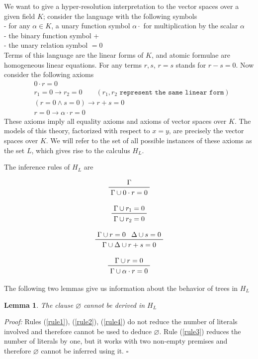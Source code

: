 \documentclass[a4paper,12pt,oneside]{book}
\newtheorem{lemma}[theorem]{Lemma}
\newcommand*{\QED}{\hfill\ensuremath{\square}}
\let\emptyset\varnothing
\let\e\wedge
\begin{document}
We want to give a hyper-resolution interpretation to the vector spaces over a given field $K$; consider the language with the following symbols\\
- for any $\alpha\in K$, a unary function symbol $\alpha\cdot$ for multiplication by the scalar $\alpha$\\
-  the binary function symbol +\\
- the unary relation symbol $=0$\\
Terms of this language are the linear forms of $K$, and atomic formulae are homo\-geneous linear equations. For any terms $r,s$, $r=s$ stands for $r-s=0$. Now consider the following axioms
\begin{eqnarray}
&0\cdot r =0 \\ \label{vec.spac1}
&r_1=0\rightarrow r_2 =0  \qquad (r_1,r_2 \texttt{ represent the same linear form}) \\
& ( r=0 \e s=0 )\rightarrow r+s =0 \\
& r=0 \rightarrow \alpha\cdot r =0 \label{vec.spac.ultimo}
\end{eqnarray}
These axioms imply all equality axioms and axioms of vector spaces over $K$. The models of this theory, factorized with respect to $x=y$, are precisely the vector spaces over $K$.
We will refer to the set of all possible instances of these axioms as the set $L$, which gives rise to the calculus $H_L$. 

\noindent The inference rules of $H_L$ are

\begin{equation} \label{rule1}
\prftree{\Gamma}{\Gamma\cup 0\cdot r=0 }
\end{equation}

\begin{equation} \label{rule2}
\prftree{\Gamma\cup r_1=0 }{\Gamma\cup r_2=0 }
\end{equation}

\begin{equation} \label{rule3}
\prftree{\Gamma\cup r=0} {\Delta\cup s=0 }{\Gamma\cup\Delta\cup  r+s=0}
\end{equation}

\begin{equation} \label{rule4}
\prftree{\Gamma\cup r=0}{\Gamma\cup \alpha\cdot r=0 }
\end{equation}

\noindent The following two lemmas give us information about the behavior of trees in $H_L$
\begin{lemma}\label{lemma_nempty}
The clause $\emptyset$ cannot be derived in $H_L$
\end{lemma}
\textit{Proof:} Rules (\ref{rule1}), (\ref{rule2}), (\ref{rule4}) do not reduce the number of literals involved and therefore cannot be used to deduce $\emptyset$. Rule (\ref{rule3}) reduces the number of literals by one, but it works with two non-empty premises and therefore $\emptyset$ cannot be inferred using it. \QED
\end{document}
